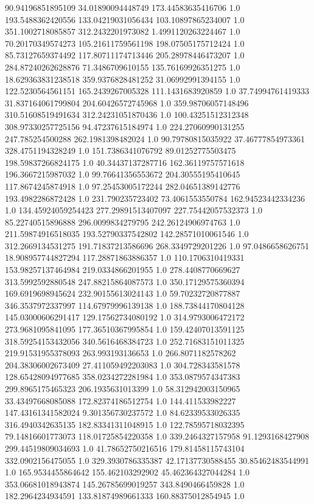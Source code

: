 90.94196851895109	34.01890094448749	173.44583635416706	1.0
193.5488362420556	133.04219031056434	103.10897865234007	1.0
351.1002718085857	312.2432201973082	1.4991120263224467	1.0
70.20170349574273	105.21611759561198	198.07505175712424	1.0
85.73127659374492	117.80711174713446	205.28978446473207	1.0
284.87240262628876	71.3486709610155	135.76169926351275	1.0
18.629363831238518	359.9376828481252	31.06992991394155	1.0
122.5230564561151	165.2439267005328	111.1431683920859	1.0
37.74994761419333	31.837164061799804	204.60426572745968	1.0
359.98706057148496	310.51608519491634	312.24231051870436	1.0
100.43251512312348	308.97330257725156	94.47237615184974	1.0
224.27060990131255	247.785254500288	262.1981398482024	1.0
90.79780815035922	37.46777854973361	328.4751194328249	1.0
151.7386341076792	89.01252775503475	198.59837266824175	1.0
40.34437137287716	162.36119757571618	196.3667215987032	1.0
99.76641356553672	204.30555195410645	117.8674245874918	1.0
97.25453005172244	282.04651389142776	193.4982286872428	1.0
231.790235723402	73.4061553550784	162.94523442334236	1.0
134.45924059254423	277.29891513407097	227.75442057532373	1.0
85.22740515896888	296.0099834279795	242.26124906974763	1.0
211.59874916518035	193.52790337542802	142.28571010061546	1.0
312.2669134531275	191.71837213586696	268.3349729201226	1.0
97.0486658626751	18.908957744827294	117.28871863886357	1.0
110.1706310419331	153.98257137464984	219.0334866201955	1.0
278.4408770669627	313.5992592880548	247.88215864087573	1.0
350.17129575360394	169.6919698945624	232.90155613024143	1.0
59.70232720877887	346.3537972337997	114.67979996139138	1.0
188.73844170804128	145.03000606291417	129.17562734080192	1.0
314.9793006472172	273.9681095841095	177.36510367995854	1.0
159.42407013591125	318.59254153432056	340.5616468384723	1.0
252.71683151011325	219.91531955378093	263.993193136653	1.0
266.8071182578262	204.38306002673409	27.411059492203083	1.0
304.728343581578	128.65428094977685	358.0234272281984	1.0
353.0879574347383	299.8965175465323	206.1935631013399	1.0
58.312942003150965	33.43497668085088	172.82374186512754	1.0
144.411533982227	147.43161341582024	9.301356730237572	1.0
84.62339533026335	316.4940342635135	182.83341311048915	1.0
122.78595718032395	79.14816601773073	118.01725854220358	1.0
339.2464327157958	91.1293168427908	299.44519809034693	1.0
41.78652750216516	179.81458115743104	332.0902156475055	1.0
329.3930786335387	42.17137730588455	30.85462483544991	1.0
165.9534455864642	155.462103292902	45.462364327044284	1.0
353.06681018943874	145.26785699019257	343.8490466459828	1.0
182.2964234934591	133.81874989661333	160.88375012854945	1.0

